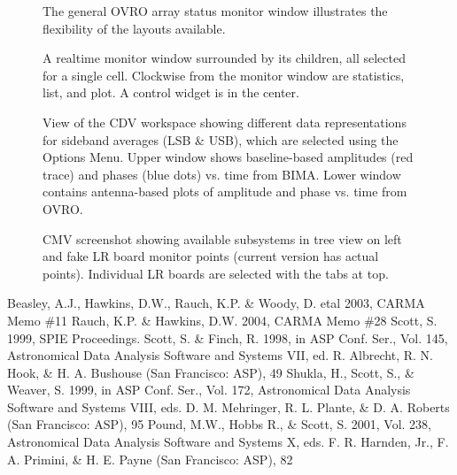 \documentclass[preprint]{aastex}
\begin{document}
   \begin{figure}
   \caption[example]
   { \label{fig:winarray}
      The general OVRO array status monitor window
      illustrates the flexibility of the layouts available.
   }
   \end{figure}


\begin{figure}
   \caption  
   { \label{fig:family}
      A realtime monitor window surrounded by its children, all 
      selected for a single cell.
      Clockwise from the monitor window are
      statistics, list, and plot. 
      A control widget is in the center.          
   }
   \end{figure}

\begin{figure}
\label{f-cdvstripchart}
\caption{
View of the CDV workspace showing different data representations for
sideband averages (LSB \& USB), which are selected using the Options
Menu.  Upper window shows baseline-based amplitudes (red trace) and
phases (blue dots) vs. time from BIMA. Lower window contains
antenna-based plots of amplitude and phase vs. time from OVRO.
}
\end{figure}


\begin{figure}
\label{f-cmv}
\caption{
CMV screenshot showing available subsystems in tree view on left 
and fake LR board monitor points (current version has actual points).
Individual LR boards are selected with the tabs at top.
}
\end{figure}

\begin{thebibliography}{}
\bibitem[]{} Beasley, A.J., Hawkins, D.W., Rauch, K.P. \& Woody, D. etal 2003, CARMA Memo \#11
\bibitem[]{} Rauch, K.P. \& Hawkins, D.W. 2004, CARMA Memo \#28
\bibitem[]{} Scott, S. 1999, SPIE Proceedings.
\bibitem[]{} 
Scott, S. \& Finch, R. 1998, in ASP Conf. Ser., Vol. 145, Astronomical Data Analysis Software and Systems VII, ed. R. Albrecht, R. N. Hook, \& H. A. Bushouse (San Francisco: ASP), 49
\bibitem[]{}
Shukla, H., Scott, S., \& Weaver, S. 1999, in ASP Conf. Ser., Vol. 172, Astronomical Data Analysis Software and Systems VIII, eds. D. M. Mehringer, R. L. Plante, \& D. A. Roberts (San Francisco: ASP), 95
\bibitem[]{} Pound, M.W., Hobbs R., \& Scott, S. 2001, Vol. 238, Astronomical Data Analysis Software and Systems X, eds. F. R. Harnden, Jr., F. A. Primini, \& H. E. Payne (San Francisco: ASP), 82
\end{thebibliography}
\appendix
\clearpage
\end{document}
